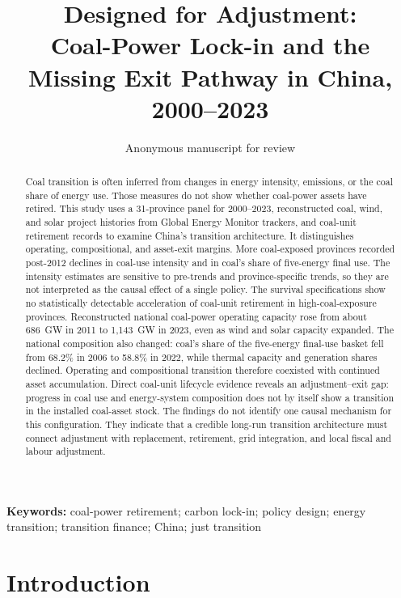 \documentclass[11pt]{article}
\title{Designed for Adjustment:\\
Coal-Power Lock-in and the Missing Exit Pathway in China, 2000--2023}
\author{Anonymous manuscript for review}
\date{}
\begin{document}
\maketitle

\begin{abstract}
Coal transition is often inferred from changes in energy intensity, emissions, or the coal share of energy use. Those measures do not show whether coal-power assets have retired. This study uses a 31-province panel for 2000--2023, reconstructed coal, wind, and solar project histories from Global Energy Monitor trackers, and coal-unit retirement records to examine China's transition architecture. It distinguishes operating, compositional, and asset-exit margins. More coal-exposed provinces recorded post-2012 declines in coal-use intensity and in coal's share of five-energy final use. The intensity estimates are sensitive to pre-trends and province-specific trends, so they are not interpreted as the causal effect of a single policy. The survival specifications show no statistically detectable acceleration of coal-unit retirement in high-coal-exposure provinces. Reconstructed national coal-power operating capacity rose from about 686~GW in 2011 to 1,143~GW in 2023, even as wind and solar capacity expanded. The national composition also changed: coal's share of the five-energy final-use basket fell from 68.2\% in 2006 to 58.8\% in 2022, while thermal capacity and generation shares declined. Operating and compositional transition therefore coexisted with continued asset accumulation. Direct coal-unit lifecycle evidence reveals an adjustment--exit gap: progress in coal use and energy-system composition does not by itself show a transition in the installed coal-asset stock. The findings do not identify one causal mechanism for this configuration. They indicate that a credible long-run transition architecture must connect adjustment with replacement, retirement, grid integration, and local fiscal and labour adjustment.
\end{abstract}

\noindent\textbf{Keywords:} coal-power retirement; carbon lock-in; policy design; energy transition; transition finance; China; just transition

\section{Introduction}
\end{document}
